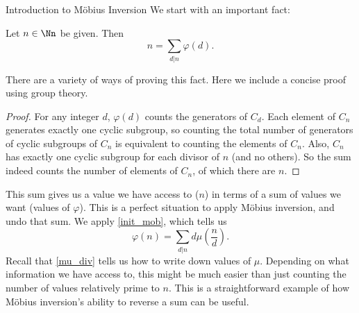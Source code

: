 \documentclass[12pt]{pom_thesis}
\begin{document}
\begin{chapter}{Introduction to M\"obius Inversion}
We start with an important fact:
\begin{thm}[Gauss]\label{gauss}
Let $n \in \Nn$ be given. Then 
\[
n = \sum_{d|n}\varphi(d).
\]
\end{thm}
There are a variety of ways of proving this fact. Here we include a concise proof using group theory.
\begin{proof}
For any integer $d$, $\varphi(d)$ counts the generators of $C_d$. Each element of $C_n$ generates exactly one cyclic subgroup, so counting the total number of generators of cyclic subgroups of $C_n$ is equivalent to counting the elements of $C_n$. Also, $C_n$ has exactly one cyclic subgroup for each divisor of $n$ (and no others). So the sum indeed counts the number of elements of $C_n$, of which there are $n$.
\end{proof}
This sum gives us a value we have access to ($n$) in terms of a sum of values we want (values of $\varphi$). This is a perfect situation to apply M\"obius inversion, and undo that sum. We apply \eqref{init_mob}, which tells us
\[
\varphi(n) = \sum_{d|n} d\mu\left(\frac nd\right).
\]
Recall that \ref{mu_div} tells us how to write down values of $\mu$. Depending on what information we have access to, this might be much easier than just counting the number of values relatively prime to $n$. This is a straightforward example of how M\"obius inversion's ability to reverse a sum can be useful.
\end{chapter}
\end{document}
